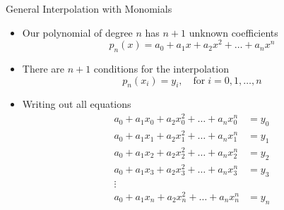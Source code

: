 \documentclass[10pt]{beamer}
\begin{document}
\begin{frame}{General Interpolation with Monomials}
\begin{itemize}

\item Our polynomial of degree $n$ has $n+1$ unknown coefficients
  \begin{equation*}
    p_n(x) = a_0 + a_1 x + a_2 x^2 +\dots + a_{n} x^{n}
  \end{equation*}
\item There are $n+1$ conditions for the interpolation 
   $$p_n(x_i) = y_i, \quad \text{for} \; i=0,1,\ldots,n$$ 
\item Writing out all equations
  \begin{align*}
    a_0 + a_1 x_0 + a_2 x_0^2 +\dots + a_{n} x_0^{n} & = y_0\\
    a_0 + a_1 x_1 + a_2 x_1^2 +\dots + a_{n} x_1^{n} & = y_1\\
    a_0 + a_1 x_2 + a_2 x_2^2 +\dots + a_{n} x_2^{n} & = y_2\\
    a_0 + a_1 x_3 + a_2 x_3^2 +\dots + a_{n} x_3^{n} & = y_3\\
    \vdots &\\
    a_0 + a_1 x_n + a_2 x_n^2 +\dots + a_{n} x_n^{n} & = y_n\\
  \end{align*}
\end{itemize}
\end{frame}
\end{document}
